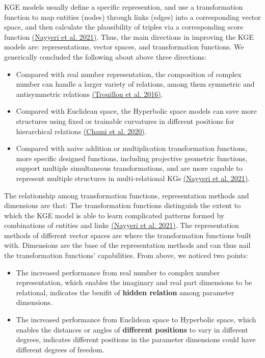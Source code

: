 \documentclass[11pt]{article}
\begin{document}
KGE models usually define a specific represention, and use a transformation function to map entities (nodes) through links (edges) into a corresponding vector space, and then calculate the plausibility of triples via a corresponding score function
\hyperlink{Nay21}{(Nayyeri et al. 2021)}.
Thus, the main directions in improving the KGE models are: representations, vector spaces, and transformation functions.
We generically concluded the following about above three directions:

\begin{itemize}
\item Compared with real number representation, the composition of complex number can handle a larger variety of relations, among them symmetric and antisymmetric relations
\hyperlink{Tro16}{(Trouillon et al. 2016)}.

\item Compared with Euclidean space, the Hyperbolic space models can save more structures using fixed or trainable curvatures in different positions for hierarchical relations
\hyperlink{Cha20}{(Chami et al. 2020)}.

\item Compared with naive addition or multiplication transformation functions, more specific designed functions, including projective geometric functions, 
support multiple simultaneous transformations, and are more capable to represent multiple structures in multi-relational KGs
\hyperlink{Nay21}{(Nayyeri et al. 2021)}.
\end{itemize}

The relationship among transformation functions, representation methods and dimensions are that:
The transformation functions distinguish the extent to which the KGE model is able to learn complicated patterns formed by combinations of entities and links
\hyperlink{Nay21}{(Nayyeri et al. 2021)}.
The representation methods of different vector spaces are where the transformation functions built with.
Dimensions are the base of the representation methods and can thus nail the transformation functions' capabilities.
From above, we noticed two points:

\begin{itemize}
\item The increased performance from real number to complex number representation, which enables the imaginary and real part dimensions to be relational, indicates the benifit of \textbf{hidden relation} among parameter dimensions.

\item The increased performance from Euclidean space to Hyperbolic space, which enables the distances or angles of \textbf{different positions} to vary in different degrees, indicates different positions in the parameter dimensions could have different degrees of freedom. 
\end{itemize}
\end{document}
